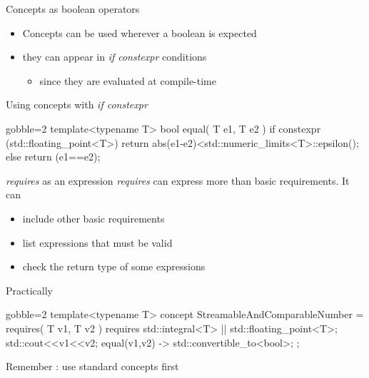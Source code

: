 \begin{frame}[fragile]
    \begin{block}{Concepts as boolean operators}
      \begin{itemize}
        \item Concepts can be used wherever a boolean is expected
        \item they can appear in {\it if constexpr} conditions
          \begin{itemize}
          \item since they are evaluated at compile-time
          \end{itemize}
      \end{itemize}
    \end{block}
    \begin{exampleblock}{Using concepts with {\it if constexpr}}
      \small
      \begin{cppcode*}{gobble=2}
      template<typename T>
      bool equal( T e1, T e2 )
      {
        if constexpr (std::floating_point<T>) {
          return abs(e1-e2)<std::numeric_limits<T>::epsilon();
        } else {
          return (e1==e2);
        }
      }
      \end{cppcode*}
    \end{exampleblock}
\end{frame}

\begin{frame}[fragile]
    \begin{block}{{\it requires} as an expression}
        {\it requires} can express more than basic requirements. It can
        \begin{itemize}
            \item include other basic requirements
            \item list expressions that must be valid
            \item check the return type of some expressions
        \end{itemize}
    \end{block}
    \begin{exampleblock}{Practically}
      \small
      \begin{cppcode*}{gobble=2}
      template<typename T>
      concept StreamableAndComparableNumber =
      requires( T v1, T v2 ) {
        requires std::integral<T> || std::floating_point<T>;
        std::cout<<v1<<v2;
        { equal(v1,v2) } -> std::convertible_to<bool>;
      };
      \end{cppcode*}
    \end{exampleblock}
    Remember : use standard concepts first
\end{frame}


